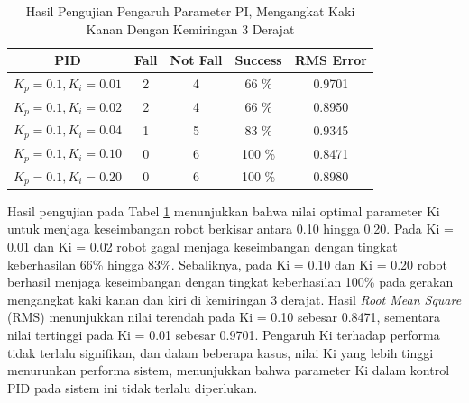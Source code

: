 \begin{enumerate}[label=\Alph*.]
        \begin{table}[h]
            \centering
            \caption{Hasil Pengujian Pengaruh Parameter PI, Mengangkat Kaki Kanan Dengan Kemiringan 3 Derajat}
            \begin{tabular}{|c|c|c|c|c|}
                \hline
                \textbf{PID} & \textbf{Fall} & \textbf{Not Fall} & \textbf{Success} & RMS Error \\
                \hline
                $K_p = 0.1, K_i = 0.01$ & 2 & 4 & 66 \%  & 0.9701\\
                $K_p = 0.1, K_i = 0.02$ & 2 & 4 & 66 \%  & 0.8950\\
                $K_p = 0.1, K_i = 0.04$ & 1 & 5 & 83 \%  & 0.9345\\
                $K_p = 0.1, K_i = 0.10$ & 0 & 6 & 100 \% & 0.8471\\
                $K_p = 0.1, K_i = 0.20$ & 0 & 6 & 100 \% & 0.8980\\           
                \hline
            \end{tabular}
            \label{tab:pengujian_pi}
        \end{table}

        \hspace*{1em} Hasil pengujian pada Tabel \ref{tab:pengujian_pi} menunjukkan bahwa nilai optimal parameter Ki untuk menjaga keseimbangan robot berkisar antara 0.10 hingga 0.20. Pada Ki = 0.01 dan Ki = 0.02  robot gagal menjaga keseimbangan dengan tingkat keberhasilan 66\% hingga 83\%. Sebaliknya, pada Ki = 0.10 dan Ki = 0.20  robot berhasil menjaga keseimbangan dengan tingkat keberhasilan 100\% pada gerakan mengangkat kaki kanan dan kiri di kemiringan 3 derajat. Hasil \textit{Root Mean Square} (RMS) menunjukkan nilai terendah pada Ki = 0.10 sebesar 0.8471, sementara nilai tertinggi pada Ki = 0.01 sebesar 0.9701. Pengaruh Ki terhadap performa tidak terlalu signifikan, dan dalam beberapa kasus, nilai Ki yang lebih tinggi menurunkan performa sistem, menunjukkan bahwa parameter Ki dalam kontrol PID pada sistem ini tidak terlalu diperlukan.


\end{enumerate}
